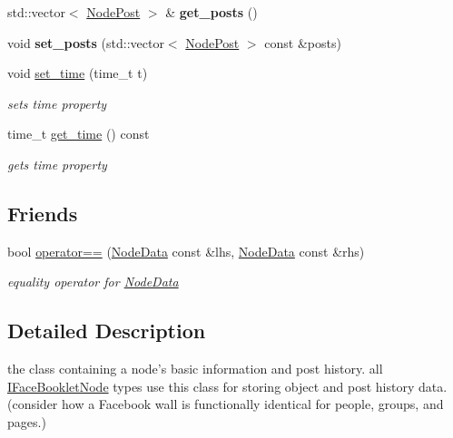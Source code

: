 \begin{DoxyCompactItemize}
\item 
\hypertarget{classfb_1_1_node_data_a2d731cdc4701363bbffe98d79e293453}{std\+::vector$<$ \hyperlink{structfb_1_1_node_post}{Node\+Post} $>$ \& {\bfseries get\+\_\+posts} ()}\label{classfb_1_1_node_data_a2d731cdc4701363bbffe98d79e293453}

\item 
\hypertarget{classfb_1_1_node_data_a7e0387a3b5f6f28b07b9ba1faf007298}{void {\bfseries set\+\_\+posts} (std\+::vector$<$ \hyperlink{structfb_1_1_node_post}{Node\+Post} $>$ const \&posts)}\label{classfb_1_1_node_data_a7e0387a3b5f6f28b07b9ba1faf007298}

\item 
void \hyperlink{classfb_1_1_node_data_a716a7264a589826effcf5a2d9f703f56}{set\+\_\+time} (time\+\_\+t t)
\begin{DoxyCompactList}\small\item\em sets time property \end{DoxyCompactList}\item 
time\+\_\+t \hyperlink{classfb_1_1_node_data_a4eb55ccdaa280ac553252419e5118593}{get\+\_\+time} () const 
\begin{DoxyCompactList}\small\item\em gets time property \end{DoxyCompactList}\end{DoxyCompactItemize}
\subsection*{Friends}
\begin{DoxyCompactItemize}
\item 
\hypertarget{classfb_1_1_node_data_afc99fbf74a99bfdfcd08a0adaca816d0}{bool \hyperlink{classfb_1_1_node_data_afc99fbf74a99bfdfcd08a0adaca816d0}{operator==} (\hyperlink{classfb_1_1_node_data}{Node\+Data} const \&lhs, \hyperlink{classfb_1_1_node_data}{Node\+Data} const \&rhs)}\label{classfb_1_1_node_data_afc99fbf74a99bfdfcd08a0adaca816d0}

\begin{DoxyCompactList}\small\item\em equality operator for \hyperlink{classfb_1_1_node_data}{Node\+Data} \end{DoxyCompactList}\end{DoxyCompactItemize}


\subsection{Detailed Description}
the class containing a node's basic information and post history.  all \hyperlink{structfb_1_1_i_face_booklet_node}{I\+Face\+Booklet\+Node} types use this class for storing object and post history data. (consider how a Facebook wall is functionally identical for people, groups, and pages.) 

